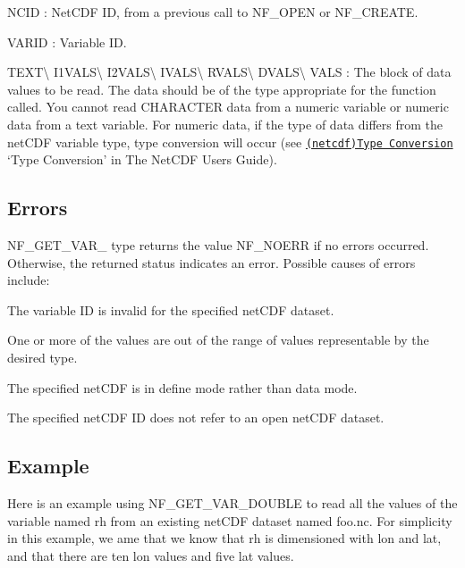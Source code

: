 {\ttfamily N\+C\+ID} \+: Net\+C\+DF ID, from a previous call to N\+F\+\_\+\+O\+P\+EN or N\+F\+\_\+\+C\+R\+E\+A\+TE.

{\ttfamily V\+A\+R\+ID} \+: Variable ID.

{\ttfamily T\+E\+XT}\textbackslash{} {\ttfamily I1\+V\+A\+LS}\textbackslash{} {\ttfamily I2\+V\+A\+LS}\textbackslash{} {\ttfamily I\+V\+A\+LS}\textbackslash{} {\ttfamily R\+V\+A\+LS}\textbackslash{} {\ttfamily D\+V\+A\+LS}\textbackslash{} {\ttfamily V\+A\+LS} \+: The block of data values to be read. The data should be of the type appropriate for the function called. You cannot read C\+H\+A\+R\+A\+C\+T\+ER data from a numeric variable or numeric data from a text variable. For numeric data, if the type of data differs from the net\+C\+DF variable type, type conversion will occur (see \href{netcdf.html#Type-Conversion}{\tt (netcdf)Type Conversion} ‘\+Type Conversion’ in The Net\+C\+DF Users Guide).

\subsection*{Errors }

N\+F\+\_\+\+G\+E\+T\+\_\+\+V\+A\+R\+\_\+ type returns the value N\+F\+\_\+\+N\+O\+E\+RR if no errors occurred. Otherwise, the returned status indicates an error. Possible causes of errors include\+:


\begin{DoxyItemize}
\item The variable ID is invalid for the specified net\+C\+DF dataset.
\item One or more of the values are out of the range of values representable by the desired type.
\item The specified net\+C\+DF is in define mode rather than data mode.
\item The specified net\+C\+DF ID does not refer to an open net\+C\+DF dataset.
\end{DoxyItemize}

\subsection*{Example }

Here is an example using N\+F\+\_\+\+G\+E\+T\+\_\+\+V\+A\+R\+\_\+\+D\+O\+U\+B\+LE to read all the values of the variable named rh from an existing net\+C\+DF dataset named foo.\+nc. For simplicity in this example, we ame that we know that rh is dimensioned with lon and lat, and that there are ten lon values and five lat values.

